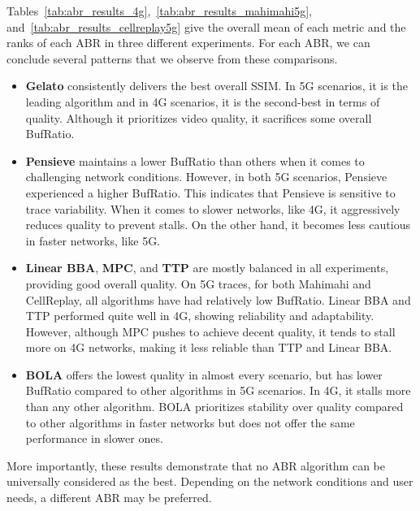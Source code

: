 Tables~\ref{tab:abr_results_4g},~\ref{tab:abr_results_mahimahi5g}, and~\ref{tab:abr_results_cellreplay5g} give the overall mean of each metric and the ranks of each ABR in three different experiments. For each ABR, we can conclude several patterns that we observe from these comparisons.

\begin{itemize}
    \item \textbf{Gelato} consistently delivers the best overall SSIM. In 5G scenarios, it is the leading algorithm and in 4G scenarios, it is the second-best in terms of quality. Although it prioritizes video quality, it sacrifices some overall BufRatio.
    
    \item \textbf{Pensieve} maintains a lower BufRatio than others when it comes to challenging network conditions. However, in both 5G scenarios, Pensieve experienced a higher BufRatio. This indicates that Pensieve is sensitive to trace variability. When it comes to slower networks, like 4G, it aggressively reduces quality to prevent stalls. On the other hand, it becomes less cautious in faster networks, like 5G.
    
    \item \textbf{Linear BBA}, \textbf{MPC}, and \textbf{TTP} are mostly balanced in all experiments, providing good overall quality. On 5G traces, for both Mahimahi and CellReplay, all algorithms have had relatively low BufRatio. Linear BBA and TTP performed quite well in 4G, showing reliability and adaptability. However, although MPC pushes to achieve decent quality, it tends to stall more on 4G networks, making it less reliable than TTP and Linear BBA.
    
    \item \textbf{BOLA} offers the lowest quality in almost every scenario, but has lower BufRatio compared to other algorithms in 5G scenarios. In 4G, it stalls more than any other algorithm. BOLA prioritizes stability over quality compared to other algorithms in faster networks but does not offer the same performance in slower ones.
\end{itemize}

More importantly, these results demonstrate that no ABR algorithm can be universally considered as the best. Depending on the network conditions and user needs, a different ABR may be preferred.

